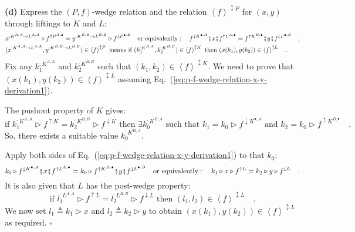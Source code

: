 \textbf{(d)} Express the $\left(P,f\right)$-wedge relation and the
relation $\left<f\right>^{\updownarrow P}$ for $(x,y)$ through liftings
to $K$ and $L$:
\begin{align}
 & x^{:K^{A,A}\rightarrow L^{A,A}}\triangleright f^{\uparrow P^{A,\bullet}}=y^{:K^{B,B}\rightarrow L^{B,B}}\triangleright f^{\downarrow P^{\bullet,B}}\quad\text{or equivalently}:\quad f^{\downarrow K^{\bullet,A}}\bef x\bef f^{\uparrow L^{A,\bullet}}=f^{\uparrow K^{B,\bullet}}\bef y\bef f^{\downarrow L^{\bullet,B}}\quad,\label{eq:p-f-wedge-relation-x-y-derivation1}\\
 & (x^{:K^{A,A}\rightarrow L^{A,A}},y^{:K^{B,B}\rightarrow L^{B,B}})\in\left<f\right>^{\updownarrow P}\text{ means if }(k_{1}^{:K^{A,A}},k_{2}^{:K^{B,B}})\in\left<f\right>^{\updownarrow K}\text{ then }(x(k_{1}),y(k_{2}))\in\left<f\right>^{\updownarrow L}\quad.\nonumber 
\end{align}
Fix any $k_{1}^{:K^{A,A}}$ and $k_{2}^{:K^{B,B}}$ such that $(k_{1},k_{2})\in\left<f\right>^{\updownarrow K}$.
We need to prove that $(x(k_{1}),y(k_{2}))\in\left<f\right>^{\updownarrow L}$
assuming Eq.~(\ref{eq:p-f-wedge-relation-x-y-derivation1}).

The pushout property of $K$ gives:
\[
\text{if }k_{1}^{:K^{A,A}}\triangleright f^{\uparrow K}=k_{2}^{:K^{B,B}}\triangleright f^{\downarrow K}\text{ then }\exists k_{0}^{:K^{B,A}}\text{ such that }k_{1}=k_{0}\triangleright f^{\downarrow K^{\bullet,A}}\text{ and }k_{2}=k_{0}\triangleright f^{\uparrow K^{B,\bullet}}\quad.
\]
So, there exists a suitable value $k_{0}^{:K^{B,A}}$.%
\begin{comment}
By Statement~\ref{subsec:Statement-wedge-law-from-parametricity}(a),
the values $k_{1}$, $k_{2}$ are in the $\left(P,f\right)$-wedge
relation: $k_{1}\triangleright f^{\uparrow K}=k_{2}\triangleright f^{\downarrow K}$.
\end{comment}
{} Apply both sides of Eq.~(\ref{eq:p-f-wedge-relation-x-y-derivation1})
to that $k_{0}$:
\[
k_{0}\triangleright f^{\downarrow K^{\bullet,A}}\bef x\bef f^{\uparrow L^{A,\bullet}}=k_{0}\triangleright f^{\uparrow K^{B,\bullet}}\bef y\bef f^{\downarrow L^{\bullet,B}}\quad\text{or equivalently}:\quad k_{1}\triangleright x\triangleright f^{\uparrow L}=k_{2}\triangleright y\triangleright f^{\downarrow L}\quad.
\]
 It is also given that $L$ has the post-wedge property:
\[
\text{if }l_{1}^{:L^{A,A}}\triangleright f^{\uparrow L}=l_{2}^{:L^{B,B}}\triangleright f^{\downarrow L}\text{ then }(l_{1},l_{2})\in\left<f\right>^{\updownarrow L}\quad.
\]
We now set $l_{1}\triangleq k_{1}\triangleright x$ and $l_{2}\triangleq k_{2}\triangleright y$
to obtain $(x(k_{1}),y(k_{2}))\in\left<f\right>^{\updownarrow L}$
as required. $\square$

